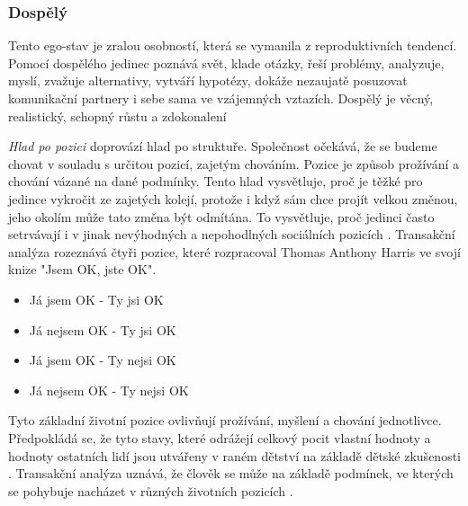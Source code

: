    
    \subsubsection*{Dospělý} 
    Tento ego-stav je zralou osobností, která se vymanila z reproduktivních tendencí. Pomocí dospělého jedinec poznává svět, klade otázky, řeší problémy, analyzuje, myslí, zvažuje alternativy, vytváří hypotézy, dokáže nezaujatě posuzovat komunikační partnery i sebe sama ve vzájemných vztazích. Dospělý je věcný, realistický, schopný růstu a zdokonalení \cite{translacni_analyza_prirucka, socialni_psychologie_pro_pedagogy}\\

\newpage

{\it Hlad po pozici} doprovází hlad po struktuře. 
Společnost očekává, že se budeme chovat v souladu s určitou pozicí, zajetým chováním. 
Pozice je způsob prožívání a chování vázané na dané podmínky. 
Tento hlad vysvětluje, proč je těžké pro jedince vykročit ze zajetých kolejí, protože i když sám chce projít velkou změnou, jeho okolím může tato změna být odmítána. 
To vysvětluje, proč jedinci často setrvávají i v jinak nevýhodných  a nepohodlných sociálních pozicích \cite{everesta}. 
Transakční analýza rozeznává čtyři pozice, které rozpracoval Thomas Anthony Harris ve svojí knize "Jsem OK, jste OK".
    
    \begin{itemize}
        \item Já jsem OK - Ty jsi OK
        \item Já nejsem OK - Ty jsi OK
        \item Já jsem OK - Ty nejsi OK
        \item Já nejsem OK - Ty nejsi OK
    \end{itemize}{}

Tyto základní životní pozice ovlivňují prožívání, myšlení a chování jednotlivce. Předpokládá se, že tyto stavy, které odrážejí celkový pocit vlastní hodnoty a hodnoty ostatních lidí jsou utvářeny v raném dětství na základě dětské zkušenosti \cite{transakcni_analyza_cata}. Transakční analýza uznává, že člověk se může na základě podmínek, ve kterých se pohybuje nacházet v různých životních pozicích \cite{translacni_analyza_prirucka}.





